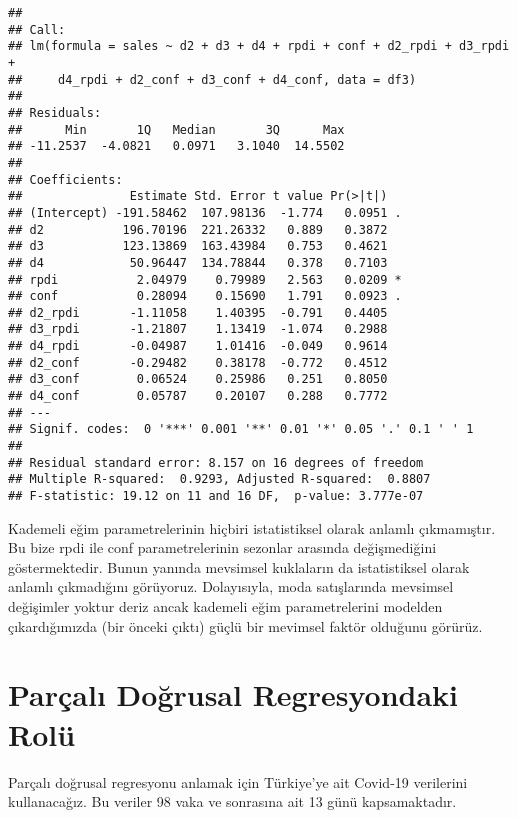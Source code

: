 \documentclass[
]{book}
\begin{document}
\begin{verbatim}
## 
## Call:
## lm(formula = sales ~ d2 + d3 + d4 + rpdi + conf + d2_rpdi + d3_rpdi + 
##     d4_rpdi + d2_conf + d3_conf + d4_conf, data = df3)
## 
## Residuals:
##      Min       1Q   Median       3Q      Max 
## -11.2537  -4.0821   0.0971   3.1040  14.5502 
## 
## Coefficients:
##               Estimate Std. Error t value Pr(>|t|)  
## (Intercept) -191.58462  107.98136  -1.774   0.0951 .
## d2           196.70196  221.26332   0.889   0.3872  
## d3           123.13869  163.43984   0.753   0.4621  
## d4            50.96447  134.78844   0.378   0.7103  
## rpdi           2.04979    0.79989   2.563   0.0209 *
## conf           0.28094    0.15690   1.791   0.0923 .
## d2_rpdi       -1.11058    1.40395  -0.791   0.4405  
## d3_rpdi       -1.21807    1.13419  -1.074   0.2988  
## d4_rpdi       -0.04987    1.01416  -0.049   0.9614  
## d2_conf       -0.29482    0.38178  -0.772   0.4512  
## d3_conf        0.06524    0.25986   0.251   0.8050  
## d4_conf        0.05787    0.20107   0.288   0.7772  
## ---
## Signif. codes:  0 '***' 0.001 '**' 0.01 '*' 0.05 '.' 0.1 ' ' 1
## 
## Residual standard error: 8.157 on 16 degrees of freedom
## Multiple R-squared:  0.9293, Adjusted R-squared:  0.8807 
## F-statistic: 19.12 on 11 and 16 DF,  p-value: 3.777e-07
\end{verbatim}

Kademeli eğim parametrelerinin hiçbiri istatistiksel olarak anlamlı çıkmamıştır. Bu bize rpdi ile conf parametrelerinin sezonlar arasında değişmediğini göstermektedir. Bunun yanında mevsimsel kuklaların da istatistiksel olarak anlamlı çıkmadığını görüyoruz. Dolayısıyla, moda satışlarında mevsimsel değişimler yoktur deriz ancak kademeli eğim parametrelerini modelden çıkardığımızda (bir önceki çıktı) güçlü bir mevimsel faktör olduğunu görürüz.

\hypertarget{paruxe7alux131-doux11frusal-regresyondaki-roluxfc}{%
\section{Parçalı Doğrusal Regresyondaki Rolü}\label{paruxe7alux131-doux11frusal-regresyondaki-roluxfc}}

Parçalı doğrusal regresyonu anlamak için Türkiye'ye ait Covid-19 verilerini kullanacağız. Bu veriler 98 vaka ve sonrasına ait 13 günü kapsamaktadır.
\end{document}
